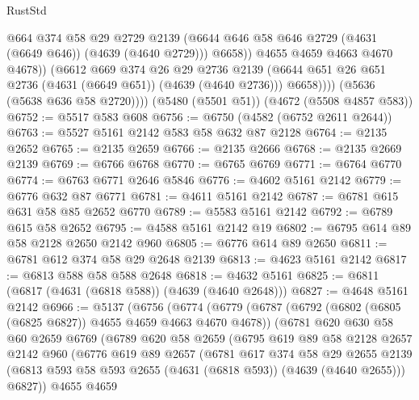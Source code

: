 \begin{lexlean}{RustStd}
\begin{coremodule}
                      @664
                      @374
                      @58
                      @29
                      @2729
                      @2139
                      (@6644 @646 @58 @646 @2729 (@4631 (@6649 @646)) (@4639 (@4640 @2729)))
                      @6658))
                  @4655
                  @4659
                  @4663
                  @4670
                  @4678))
              (@6612
                @669
                @374
                @26
                @29
                @2736
                @2139
                (@6644 @651 @26 @651 @2736 (@4631 (@6649 @651)) (@4639 (@4640 @2736)))
                @6658))))
        (@5636 (@5638 @636 @58 @2720))))
    (@5480 (@5501 @51))
    (@4672 (@5508 @4857 @583))
@6752 := @5517 @583 @608
@6756 := @6750 (@4582 (@6752 @2611 @2644))
@6763 := @5527 @5161 @2142 @583 @58 @632 @87 @2128
@6764 := @2135 @2652
@6765 := @2135 @2659
@6766 := @2135 @2666
@6768 := @2135 @2669 @2139
@6769 := @6766 @6768
@6770 := @6765 @6769
@6771 := @6764 @6770
@6774 := @6763 @6771 @2646 @5846
@6776 := @4602 @5161 @2142
@6779 := @6776 @632 @87 @6771
@6781 := @4611 @5161 @2142
@6787 := @6781 @615 @631 @58 @85 @2652 @6770
@6789 := @5583 @5161 @2142
@6792 := @6789 @615 @58 @2652
@6795 := @4588 @5161 @2142 @19
@6802 := @6795 @614 @89 @58 @2128 @2650 @2142 @960
@6805 := @6776 @614 @89 @2650
@6811 := @6781 @612 @374 @58 @29 @2648 @2139
@6813 := @4623 @5161 @2142
@6817 := @6813 @588 @58 @588 @2648
@6818 := @4632 @5161
@6825 := @6811 (@6817 (@4631 (@6818 @588)) (@4639 (@4640 @2648)))
@6827 := @4648 @5161 @2142
@6966 := @5137
    (@6756
      (@6774
        (@6779
          (@6787
            (@6792 (@6802 (@6805 (@6825 @6827)) @4655 @4659 @4663 @4670 @4678))
            (@6781
              @620
              @630
              @58
              @60
              @2659
              @6769
              (@6789
                @620
                @58
                @2659
                (@6795
                  @619
                  @89
                  @58
                  @2128
                  @2657
                  @2142
                  @960
                  (@6776
                    @619
                    @89
                    @2657
                    (@6781
                      @617
                      @374
                      @58
                      @29
                      @2655
                      @2139
                      (@6813 @593 @58 @593 @2655 (@4631 (@6818 @593)) (@4639 (@4640 @2655)))
                      @6827))
                  @4655
                  @4659

\end{coremodule}
\end{lexlean}
